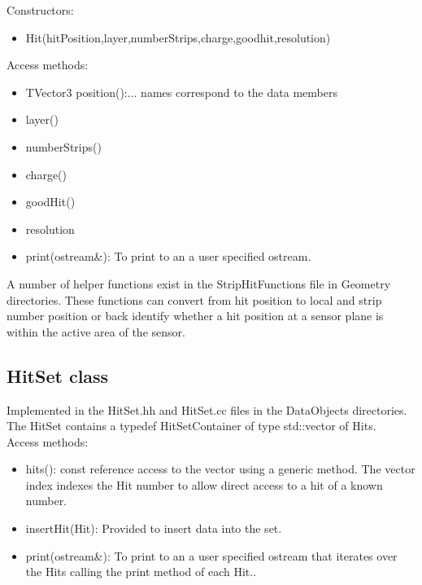 \documentclass[aps,prd,superscriptaddress,floatfix]{revtex4}
\begin{document}
Constructors:

\begin{itemize}
\item Hit(hitPosition,layer,numberStrips,charge,goodhit,resolution)
\end{itemize}

Access methods:
\begin{itemize}
\item TVector3 position():... names correspond to the data members
\item layer()
\item numberStrips()
\item charge()
\item goodHit()
\item resolution
\item print(ostream\&): To print to an a user specified ostream.
\end{itemize}

A number of helper functions exist in the StripHitFunctions file in Geometry directories.  These functions
can convert from hit position to local and strip number position or back identify whether a hit position at a sensor
plane is within the active area of the sensor.
\\

\subsection{HitSet class}
Implemented in the HitSet.hh and HitSet.cc files in the DataObjects directories.
\\

The HitSet contains a typedef HitSetContainer of type std::vector of Hits.
\\

Access methods:

\begin{itemize}
\item hits(): const reference access to the vector using a generic method.
The vector index indexes the Hit number to allow direct access to a hit of a known number.

\item insertHit(Hit): Provided to insert data into the set.

\item print(ostream\&): To print to an a user specified ostream that iterates over
the Hits calling the print method of each Hit..
\end{itemize}
\end{document}
